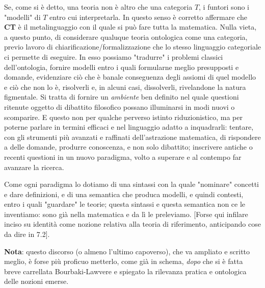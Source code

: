 \documentclass[a4paper, 11pt]{article}
\begin{document}
Se, come si è detto, una teoria non è altro che una categoria $T$, i funtori sono i "modelli" di $T$ entro cui interpretarla. 
 In questo senso è corretto affermare che \textbf{CT} è il metalinguaggio con il quale si può fare tutta la matematica. Nulla vieta, a questo punto, di considerare qualuque teoria ontologica come una categoria, previo lavoro di chiarificazione/formalizzazione che lo stesso linguaggio categoriale ci permette di eseguire. In esso possiamo "tradurre" i problemi classici dell'ontologia, fornire modelli entro i quali formularne meglio presupposti e domande, evidenziare ciò che è banale conseguenza degli assiomi di quel modello e ciò che non lo è, risolverli e, in alcuni casi, dissolverli, rivelandone la natura figmentale. Si tratta di fornire un \emph{ambiente} ben definito nel quale questioni ritenute oggetto di dibattito filosofico possano illuminarsi in modi nuovi o scomparire. E questo non per qualche perverso istinto riduzionistico, ma per poterne parlare in termini efficaci e nel linguaggio adatto a inquadrarli: tentare, con gli strumenti più avanzati e raffinati dell'astrazione matematica, di rispondere a delle domande, produrre conoscenza, e non solo dibattito; inscrivere antiche o recenti questioni in un nuovo paradigma, volto a superare e al contempo far avanzare la ricerca.
 
 Come ogni paradigma lo dotiamo di una sintassi con la quale "nominare" concetti e dare definizioni, e di una semantica che produca modelli, e quindi contesti, entro i quali "guardare" le teorie; questa sintassi e questa semantica non ce le inventiamo: sono già nella matematica e da lì le preleviamo. [Forse qui infilare inciso su identità come nozione relativa alla teoria di riferimento, anticipando cose da dire in 7.2].  
 
 \textbf{Nota}: questo discorso (o almeno l'ultimo capoverso), che va ampliato e scritto meglio, è forse più proficuo metterlo, come già in schema, \emph{dopo} che si è fatta breve carrellata Bourbaki-Lawvere e spiegato la rilevanza pratica e ontologica delle nozioni emerse.  
\end{document}
